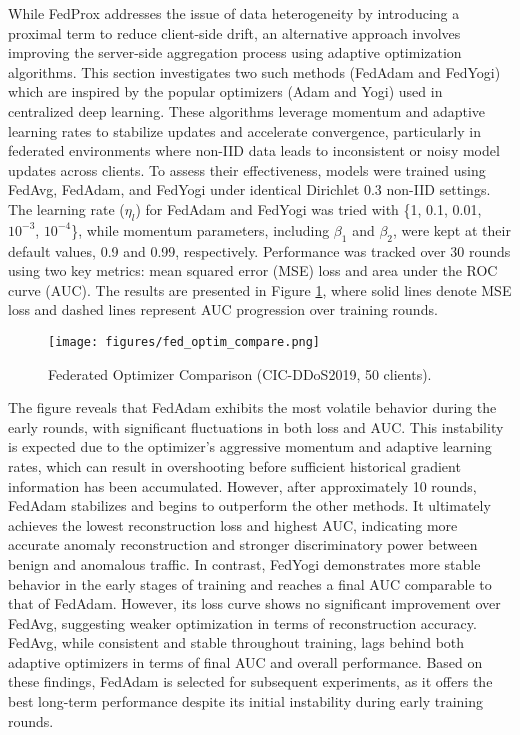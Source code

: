 While FedProx addresses the issue of data heterogeneity by introducing a proximal term to reduce client-side drift, an alternative approach involves improving the server-side aggregation process using adaptive optimization algorithms. This section investigates two such methods (FedAdam and FedYogi) which are inspired by the popular optimizers (Adam and Yogi) used in centralized deep learning. These algorithms leverage momentum and adaptive learning rates to stabilize updates and accelerate convergence, particularly in federated environments where non-IID data leads to inconsistent or noisy model updates across clients. To assess their effectiveness, models were trained using FedAvg, FedAdam, and FedYogi under identical Dirichlet 0.3 non-IID settings. The learning rate ($\eta_l$) for FedAdam and FedYogi was tried with \{1, 0.1, 0.01, $10^{-3}$, $10^{-4}$\}, while momentum parameters, including $\beta_1$ and $\beta_2$, were kept at their default values, 0.9 and 0.99, respectively. Performance was tracked over 30 rounds using two key metrics: mean squared error (MSE) loss and area under the ROC curve (AUC). The results are presented in Figure \ref{fig:fed_optim_compare}, where solid lines denote MSE loss and dashed lines represent AUC progression over training rounds.

\begin{figure}[h]
    \centering
    \texttt{[image: figures/fed\_optim\_compare.png]}
    \caption{Federated Optimizer Comparison (CIC-DDoS2019, 50 clients).}
    \label{fig:fed_optim_compare}
\end{figure}

The figure reveals that FedAdam exhibits the most volatile behavior during the early rounds, with significant fluctuations in both loss and AUC. This instability is expected due to the optimizer’s aggressive momentum and adaptive learning rates, which can result in overshooting before sufficient historical gradient information has been accumulated. However, after approximately 10 rounds, FedAdam stabilizes and begins to outperform the other methods. It ultimately achieves the lowest reconstruction loss and highest AUC, indicating more accurate anomaly reconstruction and stronger discriminatory power between benign and anomalous traffic. In contrast, FedYogi demonstrates more stable behavior in the early stages of training and reaches a final AUC comparable to that of FedAdam. However, its loss curve shows no significant improvement over FedAvg, suggesting weaker optimization in terms of reconstruction accuracy. FedAvg, while consistent and stable throughout training, lags behind both adaptive optimizers in terms of final AUC and overall performance. Based on these findings, FedAdam is selected for subsequent experiments, as it offers the best long-term performance despite its initial instability during early training rounds.

